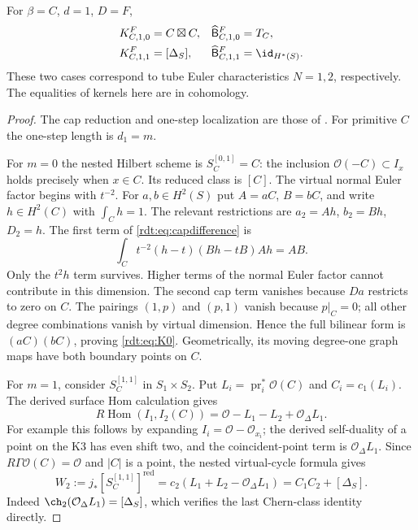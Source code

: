 \begin{proposition}
\label{rdt:prop:firstkernels}
For $\beta=C$, $d=1$, $D=F$,
\begin{align}
 K^F_{C,1,0}&=C\boxtimes C,&\widehat{\mathsf B}^F_{C,1,0}&=T_C,
 \label{rdt:eq:K0}\\
 K^F_{C,1,1}&=[\Delta_S],&\widehat{\mathsf B}^F_{C,1,1}&=\id_{H^*(S)}.
 \label{rdt:eq:K1}
\end{align}
These two cases correspond to tube Euler characteristics $N=1,2$,
respectively.
The equalities of kernels here are in cohomology.
\end{proposition}
\begin{proof}
The cap reduction and one-step localization are those of
\cite[\S\S4.4--5.3]{OberdieckMC}. For primitive $C$ the one-step
length is $d_1=m$.

For $m=0$ the nested Hilbert scheme is $S_C^{[0,1]}=C$: the
inclusion $\mathcal O(-C)\subset I_x$ holds precisely when $x\in C$.
Its reduced class is $[C]$. The virtual normal Euler factor begins
with $t^{-2}$. For $a,b\in H^2(S)$ put $A=aC$, $B=bC$, and write
$h\in H^2(C)$ with $\int_Ch=1$. The relevant restrictions are
$a_2=Ah$, $b_2=Bh$, $D_2=h$. The first term of
\eqref{rdt:eq:capdifference} is
\[
 \int_C t^{-2}(h-t)(Bh-tB)Ah=AB.
\]
Only the $t^2h$ term survives. Higher terms of the normal Euler
factor cannot contribute in this dimension. The second cap term
vanishes because $Da$ restricts to zero on $C$. The pairings
$(1,p)$ and $(p,1)$ vanish because $p|_C=0$; all other degree
combinations vanish by virtual dimension. Hence the full bilinear
form is $(aC)(bC)$, proving \eqref{rdt:eq:K0}. Geometrically, its
moving degree-one graph maps have both boundary points on $C$.

For $m=1$, consider $S_C^{[1,1]}$ in $S_1\times S_2$. Put
$L_i=\operatorname{pr}_i^*\mathcal O(C)$ and $C_i=c_1(L_i)$.
The derived surface Hom calculation gives
\[
 R\operatorname{Hom}(I_1,I_2(C))
       =\mathcal O-L_1-L_2+\mathcal O_\Delta L_1.
\]
For example this follows by expanding $I_i=\mathcal O-\mathcal O_{x_i}$;
the derived self-duality of a point on the K3 has even shift two,
and the coincident-point term is $\mathcal O_\Delta L_1$.
Since $R\Gamma\mathcal O(C)=\mathcal O$ and $|C|$ is a point,
the nested virtual-cycle formula
\cite[Theorem 3.1]{OberdieckMC} gives
\begin{equation}\label{rdt:eq:W}
 W_2:=j_*[S_C^{[1,1]}]^\mathrm{red}
     =c_2(L_1+L_2-\mathcal O_\Delta L_1)
     =C_1C_2+[\Delta_S].
\end{equation}
Indeed $\ch_2(\mathcal O_\Delta L_1)=[\Delta_S]$, which verifies
the last Chern-class identity directly.


\end{proof}
